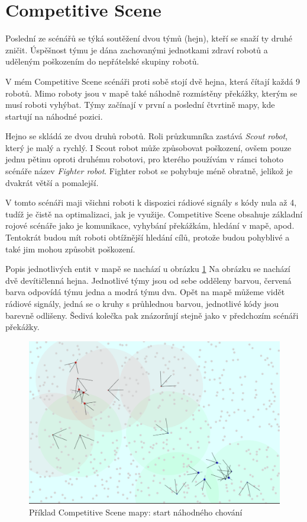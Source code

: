 \section{Competitive Scene}
Poslední ze scénářů se týká soutěžení dvou týmů (hejn), kteří se snaží ty druhé zničit. Úspěšnost týmu je dána zachovanými jednotkami zdraví robotů a uděleným poškozením do nepřátelské skupiny robotů. 
 \par
 V mém Competitive Scene scénáři proti sobě stojí dvě hejna, která čítají každá 9 robotů. Mimo roboty jsou v mapě také náhodně rozmístěny překážky, kterým se musí roboti vyhýbat. Týmy začínají v první a poslední čtvrtině mapy, kde startují na náhodné pozici. 
 \par 
Hejno se skládá ze dvou druhů robotů. Roli průzkumníka zastává \textit{Scout robot}, který je malý a rychlý. I Scout robot může způsobovat poškození, ovšem pouze jednu pětinu oproti druhému robotovi, pro kterého používám v rámci tohoto scénáře název \textit{Fighter robot}. Fighter robot se pohybuje méně obratně, jelikož je dvakrát větší a pomalejší. 
\par
V tomto scénáři maji všichni roboti k dispozici rádiové signály s kódy nula až 4, tudíž je čistě na optimalizaci, jak je využije. Competitive Scene obsahuje základní rojové scénáře jako je komunikace, vyhybání překážkám, hledání v mapě, apod. Tentokrát budou mít roboti obtížnější hledání cílů, protože budou pohyblivé a také jim mohou způsobit poškození. 
\par 
Popis jednotlivých entit v mapě se nachází u obrázku \ref{obr04:CompetitiveSceneRandomStart}
\clearpage
Na obrázku se nachází dvě devítičlenná hejna. Jednotlivé týmy jsou od sebe odděleny barvou,  červená barva odpovídá týmu jedna a modrá týmu dva. Opět na mapě můžeme vidět rádiové signály, jedná se o kruhy s průhlednou barvou, jednotlivé kódy jsou barevně odlišeny. Šedivá kolečka pak znázorňují stejně jako v předchozím scénáři překážky.  
\begin{figure}[h]\centering
	\includegraphics[width=\columnwidth]{../img/CompetitiveMap/CompetitiveStart.png}
	\caption{Příklad Competitive Scene mapy: start náhodného chování}
	\label{obr04:CompetitiveSceneRandomStart}
\end{figure}
\clearpage 

